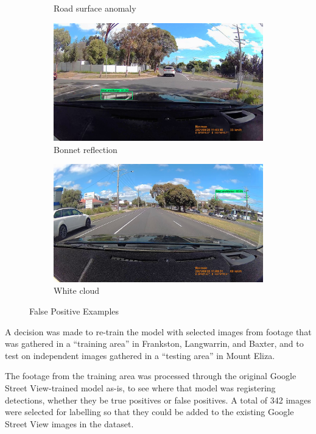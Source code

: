 \documentclass[11pt,twoside]{report}
\begin{document}
\begin{figure}[h]
\begin{subfigure}{0.3\textwidth}
	\caption{Road surface anomaly}
\end{subfigure}
\hfill
\begin{subfigure}{0.3\textwidth}
	\includegraphics[width=\textwidth]{f005_false_positive_reflection.jpg}
	\caption{Bonnet reflection}
\end{subfigure}
\begin{subfigure}{0.3\textwidth}
	\includegraphics[width=\textwidth]{f005_false_positive_random_sky.jpg}
	\caption{White cloud}
\end{subfigure}
\caption{False Positive Examples}
\label{fig:false_positives}
\end{figure}

A decision was made to re-train the model with selected images from footage that was gathered in a ``training area'' in Frankston, Langwarrin, and Baxter, and to test on independent images gathered in a ``testing area'' in Mount Eliza.  

The footage from the training area was processed through the original Google Street View-trained model as-is, to see where that model was registering detections, whether they be true positives or false positives.  A total of 342 images were selected for labelling so that they could be added to the existing Google Street View images in the dataset.
\end{document}
